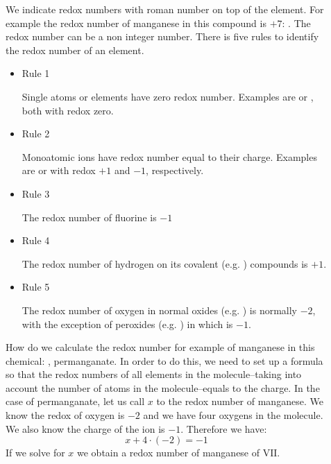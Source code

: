 \documentclass[main.tex]{subfiles} %
\begin{document}
\begin{description}
\begin{description}
\item[] 
We indicate redox numbers with roman number on top of the element. For example the redox number of manganese in this compound is $+7$: . The redox number can be a non integer number. There is five rules to identify the redox number of an element. 
\begin{itemize} 
 \item[\faCodeFork] \begin{bf}Rule 1 \end{bf} Single atoms or elements have zero redox number. Examples are  or , both with redox zero. 
  \item[\faCodeFork]  \begin{bf}Rule 2  \end{bf} Monoatomic ions have redox number equal to their charge. Examples are  or  with redox $+1$ and $-1$, respectively. 
 \item[\faCodeFork]  \begin{bf}Rule 3  \end{bf} The redox number of fluorine is $-1$ 
  \item[\faCodeFork] \begin{bf}Rule 4  \end{bf}The redox number of hydrogen on its covalent (e.g. ) compounds is $+1$. 
   \item[\faCodeFork]  \begin{bf}Rule 5  \end{bf} The redox number of oxygen in normal oxides (e.g. ) is normally $-2$, with the exception of peroxides (e.g. ) in which is $-1$.
 \end{itemize}
\item[] How do we calculate the redox number for example of manganese in this chemical: , permanganate. In order to do this, we need to set up a formula so that the redox numbers of all elements in the molecule--taking into account the number of atoms in the molecule--equals to the charge. In the case of permanganate, let us call $x$ to the redox number of manganese. We know the redox of oxygen is $-2$ and we have four oxygens in the molecule. We also know the charge of the ion is $-1$. Therefore we have:
\[x+4\cdot (-2)=-1\]
If we solve for $x$ we obtain a redox number of manganese of $\text{VII}$.
\begin{example} %

\end{example}
\end{description}
\end{description}
\end{document}
